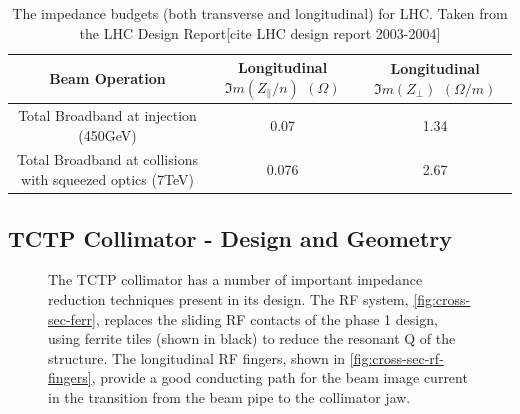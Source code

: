 \begin{table}
\caption{The impedance budgets (both transverse and longitudinal) for LHC. Taken from the LHC Design Report[cite LHC design report 2003-2004]}
\begin{center}
\begin{tabular}{c | c | c}
Beam Operation & Longitudinal $\Im{}m ( Z_{\parallel}/n )$ $( \Omega )$ & Longitudinal $\Im{}m ( Z_{\perp} )$ $( \Omega /m )$\\ \hline
Total Broadband at injection (450GeV) & 0.07 & 1.34 \\ \hline
Total Broadband at collisions with squeezed optics (7TeV) & 0.076 & 2.67 \\ \hline
\end{tabular}
\end{center}
\label{tab:lhc-impedance-budget}
\end{table}


\subsection{TCTP Collimator - Design and Geometry}



\begin{figure}
\label{fig:tctp-figure}
\caption{The TCTP collimator has a number of important impedance reduction techniques present in its design. The RF system, \ref{fig:cross-sec-ferr}, replaces the sliding RF contacts of the phase 1 design, using ferrite tiles (shown in black) to reduce the resonant Q of the structure. The longitudinal RF fingers, shown in \ref{fig:cross-sec-rf-fingers}, provide a good conducting path for the beam image current in the transition from the beam pipe to the collimator jaw.}
\end{figure}

